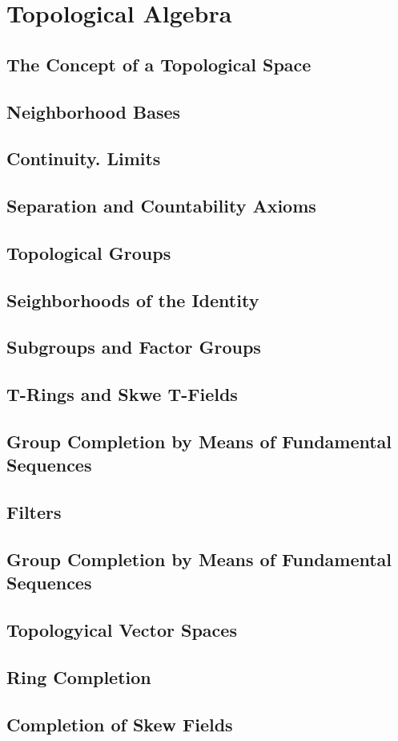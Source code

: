 \section{Topological Algebra}

\subsection{The Concept of a Topological Space}

\subsection{Neighborhood Bases}

\subsection{Continuity. Limits}

\subsection{Separation and Countability Axioms}

\subsection{Topological Groups}

\subsection{Seighborhoods of the Identity}

\subsection{Subgroups and Factor Groups}

\subsection{T-Rings and Skwe T-Fields}

\subsection{Group Completion by Means of Fundamental Sequences}

\subsection{Filters}

\subsection{Group Completion by Means of Fundamental Sequences}

\subsection{Topologyical Vector Spaces}

\subsection{Ring Completion}

\subsection{Completion of Skew Fields}